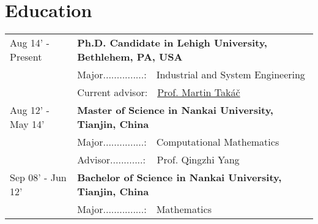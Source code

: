 \documentclass[a4paper,11pt]{article} %
\begin{document}
\section{Education}
\begin{longtable}{>{\centering}p{3.3cm}|p{14cm}}    
Aug 14' - Present &  \textbf{Ph.D. Candidate in Lehigh University, Bethlehem, PA, USA}   \\
&Major...............:~~Industrial and System Engineering \\
&Current advisor:~~\href{http://mtakac.com/}{Prof. Martin Takáč} \\
Aug 12' - May 14'&  \textbf{Master of Science in Nankai University, Tianjin, China} \\
&Major...............:~~Computational Mathematics\\
&Advisor............:~~\,Prof. Qingzhi Yang \\
Sep 08' - Jun 12' & \normalsize\textbf{Bachelor of Science in Nankai University, Tianjin, China} \\
&Major...............:~~Mathematics \\
\end{longtable}

\end{document}
